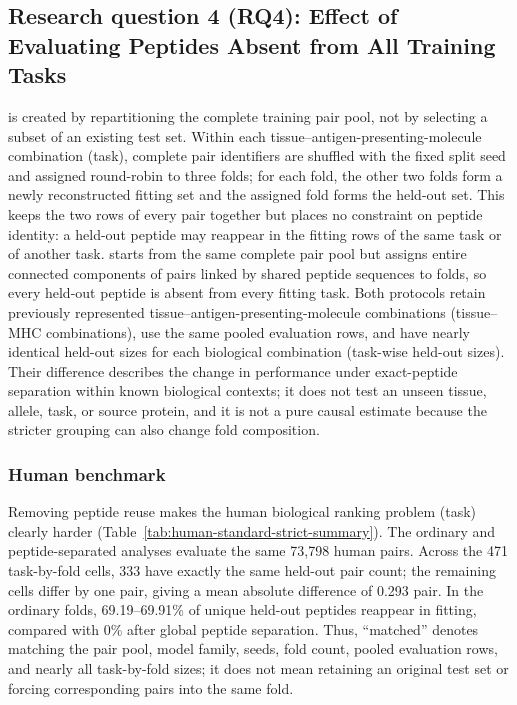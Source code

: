 \subsection{Research question 4 (RQ4): Effect of Evaluating Peptides Absent from All Training Tasks}

\plainMatchedOOF{} is created by repartitioning the complete training pair pool, not by selecting a subset of an existing test set. Within each tissue--antigen-presenting-molecule combination (task), complete pair identifiers are shuffled with the fixed split seed and assigned round-robin to three folds; for each fold, the other two folds form a newly reconstructed fitting set and the assigned fold forms the held-out set. This keeps the two rows of every pair together but places no constraint on peptide identity: a held-out peptide may reappear in the fitting rows of the same task or of another task. \plainPeptideOOF{} starts from the same complete pair pool but assigns entire connected components of pairs linked by shared peptide sequences to folds, so every held-out peptide is absent from every fitting task. Both protocols retain previously represented tissue--antigen-presenting-molecule combinations (tissue--MHC combinations), use the same pooled evaluation rows, and have nearly identical held-out sizes for each biological combination (task-wise held-out sizes). Their difference describes the change in performance under exact-peptide separation within known biological contexts; it does not test an unseen tissue, allele, task, or source protein, and it is not a pure causal estimate because the stricter grouping can also change fold composition.

\subsubsection{Human benchmark}

Removing peptide reuse makes the human biological ranking problem (task) clearly harder (Table~\ref{tab:human-standard-strict-summary}). The ordinary and peptide-separated analyses evaluate the same 73,798 human pairs. Across the 471 task-by-fold cells, 333 have exactly the same held-out pair count; the remaining cells differ by one pair, giving a mean absolute difference of 0.293 pair. In the ordinary folds, 69.19--69.91\% of unique held-out peptides reappear in fitting, compared with 0\% after global peptide separation. Thus, ``matched'' denotes matching the pair pool, model family, seeds, fold count, pooled evaluation rows, and nearly all task-by-fold sizes; it does not mean retaining an original test set or forcing corresponding pairs into the same fold.

